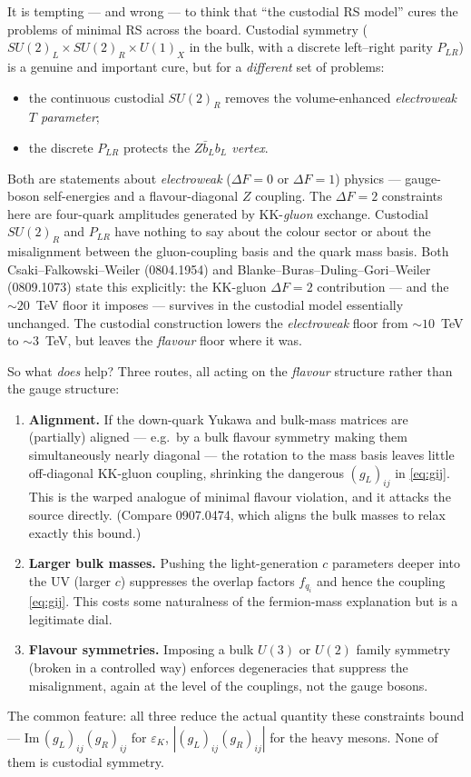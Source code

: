 \documentclass[11pt]{article}
\newcommand{\eps}{\varepsilon}
\theoremstyle{definition}
\begin{document}
It is tempting --- and wrong --- to think that ``the custodial RS model'' cures the
problems of minimal RS across the board. Custodial symmetry
($SU(2)_L\times SU(2)_R\times U(1)_X$ in the bulk, with a discrete left--right
parity $P_{LR}$) is a genuine and important cure, but for a \emph{different} set of
problems:
\begin{itemize}[leftmargin=1.4em]
\item the continuous custodial $SU(2)_R$ removes the volume-enhanced
\emph{electroweak $T$ parameter};
\item the discrete $P_{LR}$ protects the \emph{$Z\bar b_L b_L$ vertex}.
\end{itemize}
Both are statements about \emph{electroweak} ($\Delta F=0$ or $\Delta F=1$)
physics --- gauge-boson self-energies and a flavour-diagonal $Z$ coupling. The
$\Delta F=2$ constraints here are four-quark amplitudes generated by
KK-\emph{gluon} exchange. Custodial $SU(2)_R$ and $P_{LR}$ have nothing to say
about the colour sector or about the misalignment between the gluon-coupling basis
and the quark mass basis. Both Csaki--Falkowski--Weiler (0804.1954) and
Blanke--Buras--Duling--Gori--Weiler (0809.1073) state this explicitly: the
KK-gluon $\Delta F=2$ contribution --- and the $\sim20$~TeV floor it imposes ---
survives in the custodial model essentially unchanged. The custodial construction
lowers the \emph{electroweak} floor from $\sim10$~TeV to $\sim3$~TeV, but leaves
the \emph{flavour} floor where it was.

So what \emph{does} help? Three routes, all acting on the \emph{flavour} structure
rather than the gauge structure:
\begin{enumerate}[leftmargin=1.6em]
\item \textbf{Alignment.} If the down-quark Yukawa and bulk-mass matrices are
(partially) aligned --- e.g.\ by a bulk flavour symmetry making them
simultaneously nearly diagonal --- the rotation to the mass basis leaves little
off-diagonal KK-gluon coupling, shrinking the dangerous $(g_L)_{ij}$ in
\eqref{eq:gij}. This is the warped analogue of minimal flavour violation, and it
attacks the source directly. (Compare 0907.0474, which aligns the bulk masses to
relax exactly this bound.)
\item \textbf{Larger bulk masses.} Pushing the light-generation $c$ parameters
deeper into the UV (larger $c$) suppresses the overlap factors $f_{q_i}$ and hence
the coupling \eqref{eq:gij}. This costs some naturalness of the fermion-mass
explanation but is a legitimate dial.
\item \textbf{Flavour symmetries.} Imposing a bulk $U(3)$ or $U(2)$ family
symmetry (broken in a controlled way) enforces degeneracies that suppress the
misalignment, again at the level of the couplings, not the gauge bosons.
\end{enumerate}
The common feature: all three reduce the actual quantity these constraints bound
--- $\mathrm{Im}\,(g_L)_{ij}(g_R)_{ij}$ for $\eps_K$, $|(g_L)_{ij}(g_R)_{ij}|$ for
the heavy mesons. None of them is custodial symmetry.
\end{document}
